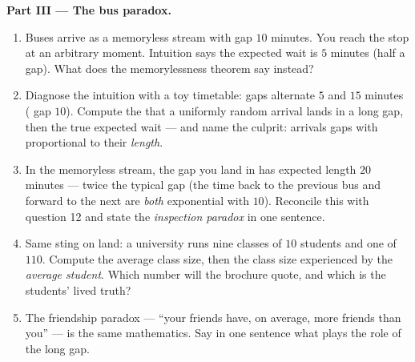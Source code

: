 \begin{problem}
\medskip
\noindent\textbf{Part III --- The bus paradox.}
\begin{enumerate}[resume]
  \item Buses arrive as a memoryless stream with  gap $10$
        minutes. You reach the stop at an arbitrary moment.
        Intuition says the expected wait is $5$ minutes
        (half a gap). What does the memorylessness theorem say
        instead?
  \item Diagnose the intuition with a toy timetable: gaps
        alternate $5$ and $15$ minutes ( gap $10$).
        Compute the  that a uniformly random arrival
        lands in a long gap, then the true expected wait ---
        and name the culprit: arrivals  gaps with
         proportional to their \emph{length}.
  \item In the memoryless stream, the gap you land in has
        expected length $20$ minutes --- twice the typical gap
        (the time back to the previous bus and forward to the
        next are \emph{both} exponential with  $10$).
        Reconcile this with question 12 and state the
        \emph{inspection paradox} in one sentence.
  \item Same sting on land: a university runs nine classes of
        $10$ students and one of $110$. Compute the average
        class size, then the class size experienced by the
        \emph{average student}. Which number will the brochure
        quote, and which is the students' lived truth?
  \item The friendship paradox --- ``your friends have, on
        average, more friends than you'' --- is the same
        mathematics. Say in one sentence what plays the role of
        the long gap.
\end{enumerate}


\end{problem}
